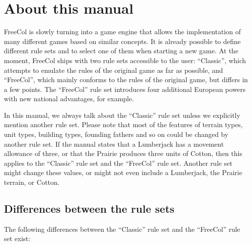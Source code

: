 \documentclass[12pt]{book}
\begin{document}
\hypertarget{About this manual}{\section{About this manual}}

FreeCol is slowly turning into a game engine that allows the
implementation of many different games based on similar concepts. It
is already possible to define different rule sets and to select one of
them when starting a new game. At the moment, FreeCol ships with two
rule sets accessible to the user: ``Classic'', which attempts to
emulate the rules of the original game as far as possible, and
``FreeCol'', which mainly conforms to the rules of the original game,
but differs in a few points. The ``FreeCol'' rule set introduces four
additional European powers with new national advantages, for example.

In this manual, we always talk about the ``Classic'' rule set unless
we explicitly mention another rule set. Please note that most of the
features of terrain types, unit types, building types, founding
fathers and so on could be changed by another rule set. If the manual
states that a Lumberjack has a movement allowance of three, or that
the Prairie produces three units of Cotton, then this applies to the
``Classic'' rule set and the ``FreeCol'' rule set. Another rule set
might change these values, or might not even include a Lumberjack, the
Prairie terrain, or Cotton.

\hypertarget{Differences between the rule sets}{\subsection{Differences between the rule sets}}

The following differences between the ``Classic'' rule set and the
``FreeCol'' rule set exist:
\end{document}
